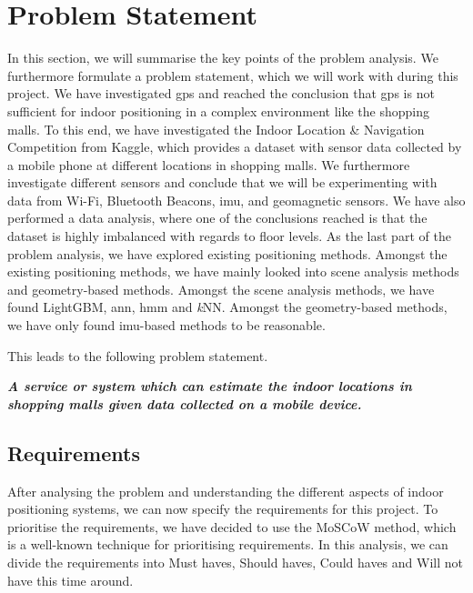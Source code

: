 \section{Problem Statement} \label{sec:problemstatement}
In this section, we will summarise the key points of the problem analysis. We furthermore formulate a problem statement, which we will work with during this project. We have investigated \gls{gps} and reached the conclusion that \gls{gps} is not sufficient for indoor positioning in a complex environment like the shopping malls. To this end, we have investigated the Indoor Location \& Navigation Competition from Kaggle, which provides a dataset with sensor data collected by a mobile phone at different locations in shopping malls. We furthermore investigate different sensors and conclude that we will be experimenting with data from Wi-Fi, Bluetooth Beacons, \gls{imu}, and geomagnetic sensors. We have also performed a data analysis, where one of the conclusions reached is that the dataset is highly imbalanced with regards to floor levels. As the last part of the problem analysis, we have explored existing positioning methods. Amongst the existing positioning methods, we have mainly looked into scene analysis methods and geometry-based methods. Amongst the scene analysis methods, we have found LightGBM, \gls{ann}, \gls{hmm} and \textit{k}NN. Amongst the geometry-based methods, we have only found \gls{imu}-based methods to be reasonable. 

This leads to the following problem statement.
\begin{center}
    \textbf{\textit{A service or system which can estimate the indoor locations in shopping malls given data collected on a mobile device.}}
\end{center}

\subsection{Requirements}
After analysing the problem and understanding the different aspects of indoor positioning systems, we can now specify the requirements for this project. To prioritise the requirements, we have decided to use the MoSCoW method, which is a well-known technique for prioritising requirements. In this analysis, we can divide the requirements into Must haves, Should haves, Could haves and Will not have this time around.\cite[140]{davidbenyon2013}

